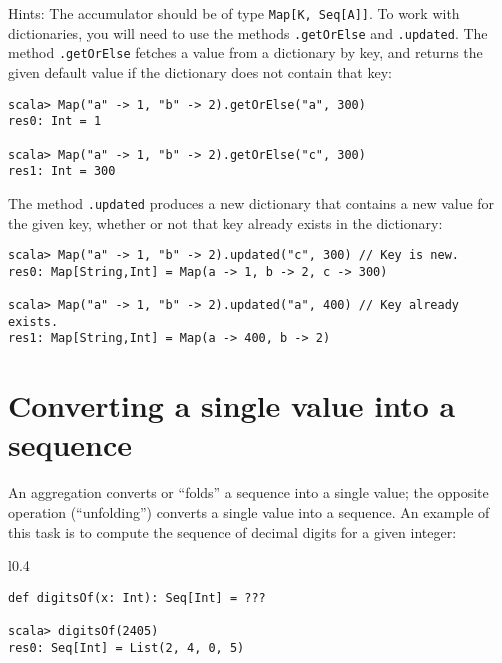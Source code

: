 Hints: The accumulator should be of type \lstinline!Map[K, Seq[A]]!.
To work with dictionaries, you will need to use the methods \lstinline!.getOrElse!
and \lstinline!.updated!. The method \lstinline!.getOrElse! fetches
a value from a dictionary by key, and returns the given default value
if the dictionary does not contain that key:
\begin{lstlisting}
scala> Map("a" -> 1, "b" -> 2).getOrElse("a", 300)
res0: Int = 1

scala> Map("a" -> 1, "b" -> 2).getOrElse("c", 300)
res1: Int = 300
\end{lstlisting}
The method \lstinline!.updated! produces a new dictionary that contains
a new value for the given key, whether or not that key already exists
in the dictionary:
\begin{lstlisting}
scala> Map("a" -> 1, "b" -> 2).updated("c", 300) // Key is new.
res0: Map[String,Int] = Map(a -> 1, b -> 2, c -> 300)

scala> Map("a" -> 1, "b" -> 2).updated("a", 400) // Key already exists.
res1: Map[String,Int] = Map(a -> 400, b -> 2) 
\end{lstlisting}
\begin{comment}
Solution:
\begin{lstlisting}
def groupBy[A, K](xs: Seq[A])(by: A => K): Map[K, Seq[A]] = {  
  val init: Map[K, Seq[A]] = Map()
  xs.foldLeft(init) { (res, x) =>
    val key = by(x)
    val seq = res.getOrElse(key, Seq()) ++ Seq(x)
    res.updated(key, seq)
  }
}
\end{lstlisting}
\end{comment}


\section{Converting a single value into a sequence\label{sec:ch2Converting-a-single}}

An aggregation converts or ``folds'' a sequence into a single value;
the opposite operation (``unfolding'') converts a single value into
a sequence. An example of this task is to compute the sequence of
decimal digits for a given integer:

\begin{wrapfigure}{l}{0.4\columnwidth}%
\vspace{-0.5\baselineskip}
\begin{lstlisting}
def digitsOf(x: Int): Seq[Int] = ???

scala> digitsOf(2405)
res0: Seq[Int] = List(2, 4, 0, 5)
\end{lstlisting}

\vspace{-1\baselineskip}
\end{wrapfigure}%

